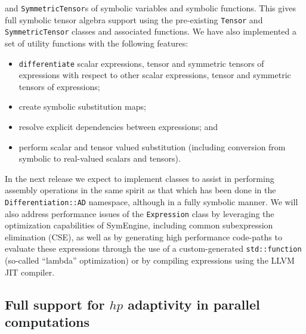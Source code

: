 \documentclass{ansarticle-preprint}
\begin{document}
and \texttt{SymmetricTensor}s of symbolic variables and symbolic functions. This
gives full symbolic tensor algebra support using the pre-existing \texttt{Tensor}
and \texttt{SymmetricTensor} classes and associated functions. We have
also implemented a set of utility functions with the following features:
\begin{itemize}
\item \texttt{differentiate} scalar expressions, tensor and symmetric tensors of expressions
with respect to other scalar expressions, tensor and symmetric tensors of expressions;
\item create symbolic substitution maps;
\item resolve explicit dependencies between expressions; and
\item perform scalar and tensor valued substitution (including conversion from symbolic to 
real-valued scalars and tensors).
\end{itemize}

In the next release we expect to implement classes to assist in performing assembly operations 
in the same spirit as that which has been done in the \texttt{Differentiation::AD} namespace,
although in a fully symbolic manner.
We will also address performance issues of the \texttt{Expression} class by leveraging
the optimization capabilities of SymEngine, including common subexpression elimination (CSE), 
as well as by generating high performance code-paths to evaluate these expressions through the
use of a custom-generated \texttt{std::function} (so-called ``lambda'' optimization) or by 
compiling expressions using the LLVM JIT compiler.

\subsection{Full support for $hp$ adaptivity in parallel computations}
\label{subsec:hp}
\end{document}
